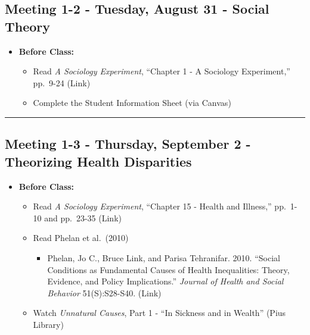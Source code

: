 \documentclass[
]{book}
\providecommand{\tightlist}{%
  \setlength{\itemsep}{0pt}\setlength{\parskip}{0pt}}
\begin{document}
\hypertarget{meeting-1-2---tuesday-august-31---social-theory}{%
\subsection*{Meeting 1-2 - Tuesday, August 31 - Social Theory}\label{meeting-1-2---tuesday-august-31---social-theory}}

\begin{itemize}
\tightlist
\item
  \textbf{Before Class:}

  \begin{itemize}
  \tightlist
  \item
    Read \emph{A Sociology Experiment}, ``Chapter 1 - A Sociology Experiment,'' pp.~9-24 (Link)
  \item
    Complete the Student Information Sheet (via Canvas)
  \end{itemize}
\end{itemize}

\begin{center}\rule{0.5\linewidth}{0.5pt}\end{center}

\hypertarget{meeting-1-3---thursday-september-2---theorizing-health-disparities}{%
\subsection*{Meeting 1-3 - Thursday, September 2 - Theorizing Health Disparities}\label{meeting-1-3---thursday-september-2---theorizing-health-disparities}}

\begin{itemize}
\tightlist
\item
  \textbf{Before Class:}

  \begin{itemize}
  \tightlist
  \item
    Read \emph{A Sociology Experiment}, ``Chapter 15 - Health and Illness,'' pp.~1-10 and pp.~23-35 (Link)
  \item
    Read Phelan et al.~(2010)

    \begin{itemize}
    \tightlist
    \item
      Phelan, Jo C., Bruce Link, and Parisa Tehranifar. 2010. ``Social Conditions as Fundamental Causes of Health Inequalities: Theory, Evidence, and Policy Implications.'' \emph{Journal of Health and Social Behavior} 51(S):S28-S40. (Link)
    \end{itemize}
  \item
    Watch \emph{Unnatural Causes}, Part 1 - ``In Sickness and in Wealth'' (Pius Library)
  \end{itemize}
\end{itemize}
\end{document}
